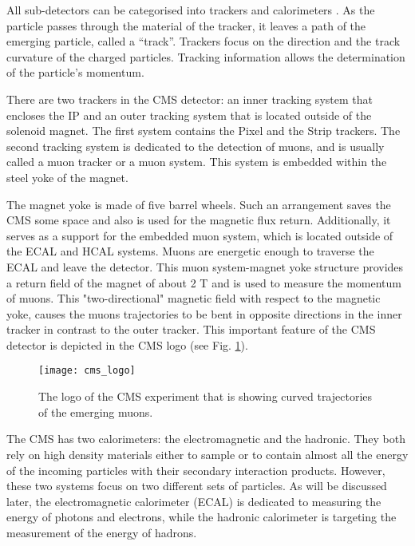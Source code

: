 \begin{normalsize}
All sub-detectors can be categorised into trackers and calorimeters \cite{Hauptman:2011zza}. As the particle passes through the material of the tracker, it leaves a path of the emerging particle, called a ``track''. Trackers focus on the direction and the track curvature of the charged particles. Tracking information allows the determination of the particle's momentum. 

There are two trackers in the CMS detector: an inner tracking system that encloses the IP and an outer tracking system that is located outside of the solenoid magnet. The first system contains the Pixel and the Strip trackers. The second tracking system is dedicated to the detection of muons, and is usually called a muon tracker or a muon system. This system is embedded within the steel yoke of the magnet. 




The magnet yoke is made of five barrel wheels. Such an arrangement saves the CMS some space and also is used for the magnetic flux return. Additionally, it serves as a support for the embedded muon system, which is located outside of the ECAL and HCAL systems. Muons are energetic enough to traverse the ECAL and leave the detector. This muon system-magnet yoke structure provides a return field of the magnet of about 2 T and is used to measure the momentum of muons. This "two-directional" magnetic field with respect to the magnetic yoke, causes the muons trajectories to be bent in opposite directions in the inner tracker in contrast to the outer tracker. This important feature of the CMS detector is depicted in the CMS logo (see Fig. \ref{cms_logo}). 

\begin{figure}[H]
  \centering
  \texttt{[image: cms\_logo]}
  \caption{The logo of the CMS experiment that is showing curved trajectories of the emerging muons.}
  \label{cms_logo}
\end{figure}


The CMS has two calorimeters: the electromagnetic and the hadronic. They both rely on high density materials either to sample or to contain almost all the energy of the incoming particles with their secondary interaction products. However, these two systems focus on two different sets of particles. As will be discussed later, the electromagnetic calorimeter (ECAL) is dedicated to measuring the energy of photons and electrons, while the hadronic calorimeter is targeting the measurement of the energy of hadrons.



\end{normalsize}
